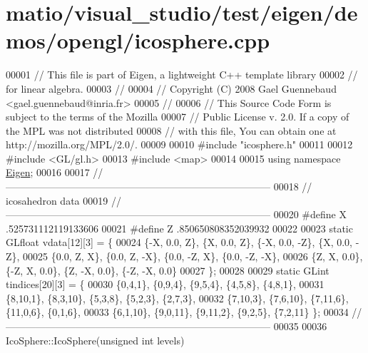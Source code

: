 \hypertarget{matio_2visual__studio_2test_2eigen_2demos_2opengl_2icosphere_8cpp_source}{}\section{matio/visual\+\_\+studio/test/eigen/demos/opengl/icosphere.cpp}
\label{matio_2visual__studio_2test_2eigen_2demos_2opengl_2icosphere_8cpp_source}

\begin{DoxyCode}
00001 \textcolor{comment}{// This file is part of Eigen, a lightweight C++ template library}
00002 \textcolor{comment}{// for linear algebra.}
00003 \textcolor{comment}{//}
00004 \textcolor{comment}{// Copyright (C) 2008 Gael Guennebaud <gael.guennebaud@inria.fr>}
00005 \textcolor{comment}{//}
00006 \textcolor{comment}{// This Source Code Form is subject to the terms of the Mozilla}
00007 \textcolor{comment}{// Public License v. 2.0. If a copy of the MPL was not distributed}
00008 \textcolor{comment}{// with this file, You can obtain one at http://mozilla.org/MPL/2.0/.}
00009 
00010 \textcolor{preprocessor}{#include "icosphere.h"}
00011 
00012 \textcolor{preprocessor}{#include <GL/gl.h>}
00013 \textcolor{preprocessor}{#include <map>}
00014 
00015 \textcolor{keyword}{using namespace }\hyperlink{namespace_eigen}{Eigen};
00016 
00017 \textcolor{comment}{//--------------------------------------------------------------------------------}
00018 \textcolor{comment}{// icosahedron data}
00019 \textcolor{comment}{//--------------------------------------------------------------------------------}
00020 \textcolor{preprocessor}{#define X .525731112119133606}
00021 \textcolor{preprocessor}{#define Z .850650808352039932}
00022 
00023 \textcolor{keyword}{static} GLfloat vdata[12][3] = \{
00024    \{-X, 0.0, Z\}, \{X, 0.0, Z\}, \{-X, 0.0, -Z\}, \{X, 0.0, -Z\},
00025    \{0.0, Z, X\}, \{0.0, Z, -X\}, \{0.0, -Z, X\}, \{0.0, -Z, -X\},
00026    \{Z, X, 0.0\}, \{-Z, X, 0.0\}, \{Z, -X, 0.0\}, \{-Z, -X, 0.0\}
00027 \};
00028 
00029 \textcolor{keyword}{static} GLint tindices[20][3] = \{
00030    \{0,4,1\}, \{0,9,4\}, \{9,5,4\}, \{4,5,8\}, \{4,8,1\},
00031    \{8,10,1\}, \{8,3,10\}, \{5,3,8\}, \{5,2,3\}, \{2,7,3\},
00032    \{7,10,3\}, \{7,6,10\}, \{7,11,6\}, \{11,0,6\}, \{0,1,6\},
00033    \{6,1,10\}, \{9,0,11\}, \{9,11,2\}, \{9,2,5\}, \{7,2,11\} \};
00034 \textcolor{comment}{//--------------------------------------------------------------------------------}
00035 
00036 IcoSphere::IcoSphere(\textcolor{keywordtype}{unsigned} \textcolor{keywordtype}{int} levels)

\end{DoxyCode}
